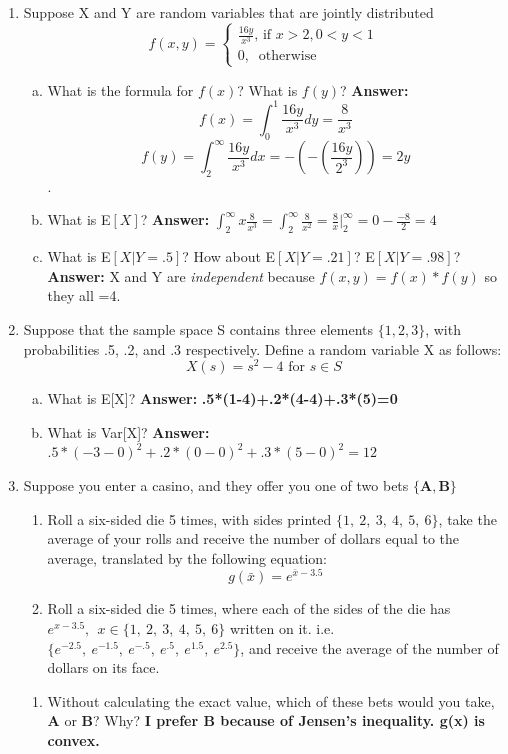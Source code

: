 \documentclass[11pt,letterpaper]{article}
\numberwithin{equation}{section}
\begin{document}
\begin{enumerate}[I]
\begin{enumerate}[1)]
\item Suppose X and Y are random variables that are jointly distributed 
$$f(x,y)=\begin{cases} \frac{16y}{x^3} \text{, if }x>2, 0<y<1\\ 0, \ \text{ otherwise }\end{cases}$$

\begin{enumerate}[a)]
\item What is the formula for $f(x)$?  What is $f(y)$?  \textbf{Answer:} 
$$f(x)=\int_0^1  \frac{16y}{x^3} dy= \frac{8}{x^3}$$  
$$f(y)=\int_2^\infty  \frac{16y}{x^3} dx= -(-(\frac{16y}{2^3}))=2y$$.
\item What is E$[X]$?  \textbf{Answer: } $\int_2^\infty  x \frac{8}{x^3} =\int_2^\infty   \frac{8}{x^2}= \frac{8}{x}|_2^\infty= 0- \frac{-8}{2}=4$
\item What is E$[X|Y=.5]$?  How about E$[X|Y=.21]$? E$[X|Y=.98]$? \textbf{Answer:}  X and Y are \emph{independent} because $f(x,y)=f(x)*f(y)$ so they all =4.
\end{enumerate}

\item Suppose that the sample space S contains three elements $\{1, 2, 3\}$, with probabilities .5, .2, and .3 respectively.  Define a random variable X as follows:
$$X(s) = s^2 - 4 \text{ for } s \in S$$ 
\begin{enumerate}[a)]
\item What is E[X]?  \textbf{Answer:}  \textbf{.5*(1-4)+.2*(4-4)+.3*(5)=0}
\item What is Var[X]? \textbf{Answer:} $.5*(-3-0)^2+.2*(0-0)^2+.3*(5-0)^2=12$

\end{enumerate}

\item Suppose you enter a casino, and they offer you one of two bets $\{\textbf{A}, \textbf{B}\}$

\begin{enumerate}
\item[\textbf{A}] Roll a six-sided die 5 times, with sides printed $\{1,\ 2,\ 3,\ 4,\ 5,\ 6\}$, take the average of your rolls and receive the number of dollars equal to the average, translated by the following equation:
$$g(\bar{x})=e^{\bar{x}-3.5}$$
\item[\textbf{B}] Roll a six-sided die 5 times, where each of the sides of the die has $e^{x-3.5},\ \ x\in\{1,\ 2,\ 3,\ 4,\ 5,\ 6\}$ written on it.  i.e. $\{e^{-2.5},\ e^{-1.5},\ e^{-.5},\ e^{.5},\ e^{1.5},\ e^{2.5}\}$, and receive the average of the number of dollars on its face.
\end{enumerate}
\begin{enumerate}
\item[a)]  Without calculating the exact value, which of these bets would you take, \textbf{A} or \textbf{B}?  Why?  \textbf{I prefer B  because of Jensen's inequality.  g(x) is convex.}


\end{enumerate}
\end{enumerate}
\end{enumerate}
\end{document}
